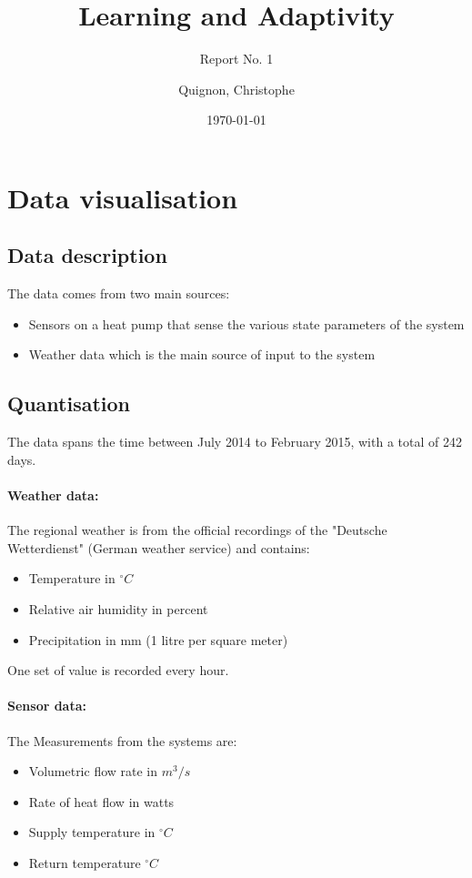 \documentclass{scrartcl}
\begin{document}
\title{Learning and Adaptivity}
\subtitle{Report No. 1}
\author{
  Quignon, Christophe
}
\date{\today}


\maketitle

\section{Data visualisation}
\subsection{Data description}
The data comes from two main sources:
\begin{itemize}
\item Sensors on a heat pump that sense the various state parameters of the system
\item Weather data which is the main source of input to the system
\end{itemize}


\subsection{Quantisation}
The data spans the time between July 2014 to February 2015, with a total of 242 days.

\paragraph{Weather data:}
The regional weather is from the official recordings of the "Deutsche Wetterdienst" (German weather service) and contains:

\begin{itemize}
\item Temperature in $^\circ C$
\item Relative air humidity in percent
\item Precipitation in mm (1 litre per square meter)
\end{itemize}

One set of value is recorded every hour.

\paragraph{Sensor data:}
The Measurements from the systems are:

\begin{itemize}
\item Volumetric flow rate in $m^3 / s$
\item Rate of heat flow in watts
\item Supply temperature in $^\circ C$
\item Return temperature $^\circ C$
\end{itemize}
\end{document}
